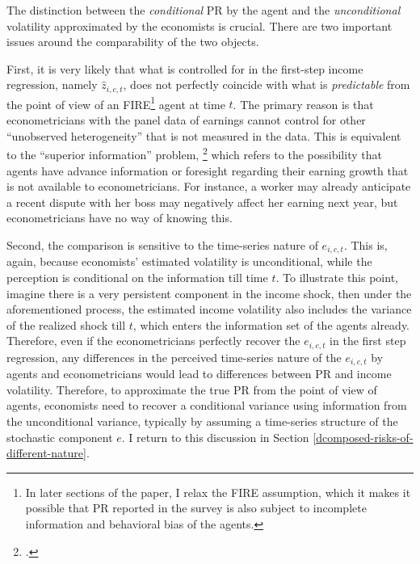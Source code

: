 The distinction between the \emph{conditional} PR by the agent and the \emph{unconditional} volatility approximated by the economists is crucial. There are two important issues around the comparability of the two objects. 

First, it is very likely that what is controlled for in the first-step income regression, namely $\hat z_{i,c,t}$, does not perfectly coincide with what is \emph{predictable} from the point of view of an FIRE\footnote{In later sections of the paper, I relax the FIRE assumption, which it makes it possible that PR reported in the survey is also subject to incomplete information and behavioral bias of the agents.} agent at time $t$. The primary reason is that econometricians with the panel data of earnings cannot control for other ``unobserved heterogeneity'' that is not measured in the data. This is equivalent to the ``superior information'' problem,  \footnote{\cite{pistaferri_superior_2001, kaufmann_disentangling_2009}.} which refers to the possibility that agents have advance information or foresight regarding their earning growth that is not available to econometricians. For instance, a worker may already anticipate a recent dispute with her boss may negatively affect her earning next year, but econometricians have no way of knowing this. 

Second, the comparison is sensitive to the time-series nature of $e_{i,c,t}$. This is, again, because economists' estimated volatility is unconditional, while the perception is conditional on the information till time $t$. To illustrate this point, imagine there is a very persistent component in the income shock, then under the aforementioned process, the estimated income volatility also includes the variance of the realized shock till $t$, which enters the information set of the agents already. Therefore, even if the econometricians perfectly recover the $e_{i,c,t}$ in the first step regression, any differences in the perceived time-series nature of the $e_{i,c,t}$ by agents and econometricians would lead to differences between PR and income volatility. Therefore, to approximate the true PR from the point of view of agents, economists need to recover a conditional variance using information from the unconditional variance, typically by assuming a time-series structure of the stochastic component $e$. I return to this discussion in Section \ref{dcomposed-risks-of-different-nature}. 

